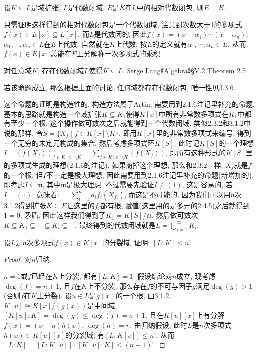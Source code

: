 \documentclass{../solutions-cn}
\begin{document}
\begin{remark}
    \begin{propstar}
        设$K \subseteq L$是域扩张, $L$是代数闭域, $E$是$K$在$L$中的相对代数闭包, 则$E = \overline{K}$.
    \end{propstar}
    只需证明这样得到的相对代数闭包是一个代数闭域, 注意到次数大于1的多项式$f(x) \in E[x] \subseteq L[x]$, 而$L$是代数闭的, 因此$f(x) = (x - \alpha_1) \cdots (x - \alpha_n)$, $\alpha_1, \cdots, \alpha_n \in L$在$E$上代数, 自然就在$K$上代数, 按$E$的定义就有$\alpha_1, \cdots, \alpha_n \in E$. 从而$f(x) \in E[x]$总能在$E$上分解称一次多项式的乘积.

    \begin{propstar}
        对任意域$K$, 存在代数闭域$L$使得$K \subseteq L$. Serge Lang《Algebra》\S V.2 Theorem 2.5
    \end{propstar}
    若该命题成立, 那么根据上面的讨论, 任何域都存在代数闭包, 唯一性见3.3.6.

    这个命题的证明是构造性的, 构造方法属于Artin, 需要用到2.1.6注记里补充的命题. 基本的思路就是构造一个域扩张$K \subseteq K_1$使得$K[x]$中所有非常数多项式在$K_1$中都有至少一个根, 这个操作做可数次之后就能得到一个代数闭域. 类似2.3.2和3.1.2中说的那样, 令$S = \{X_f \mid f \in K[x] \setminus K\}$, 即用$K[x]$里的非常数多项式来编号, 得到一个无穷的未定元构成的集合, 然后考虑多项式环$K[S]$. 此时记$K[S]$的一个理想$I = (f(X_f))_{f \in K[x] \setminus K} = \sum_{f \in K[x] \setminus K} (f(X_f))$, 即所有这种形式的$K[S]$里的多项式生成的理想(2.1.6的注记), 如果商掉这个理想, 那么和2.3.2一样, $\overline{X_f}$就是$f$的一个根, 但$I$不一定是极大理想, 因此需要用到2.1.6注记里补充的命题(新增加的), 即考虑$I \subseteq \mathfrak{m}$, 其中$\mathfrak{m}$是极大理想. 不过需要先验证$I \neq (1)$, 这是容易的, 若$I = (1)$, 意味着$1 = \sum_{i = 1}^{n} a_if_i(X_{f_i})$, 而这是不可能的, 因为我们可以用$n$次3.1.2得到扩张$K \subseteq E$让这里的$f_i$都有根, 赋值(这里用的是多元的2.4.5)之后就得到$1 = 0$, 矛盾. 因此这样我们得到了$K_1 = K[S]/\mathfrak{m}$. 然后做可数次$K \subseteq K_1 \subseteq \cdots \subseteq K_i \subseteq \cdots$. 最终得到的代数闭域就是$L = \bigcup_{i = 1}^{\infty} K_i$.
\end{remark}

\begin{exercise}[习题3.3.3]
    设$L$是$n$次多项式$f(x) \in K[x]$的分裂域, 证明: $[L:K] \leqslant n!$.
\end{exercise}

\begin{proof}
    对$n$归纳.

    $n = 1$或$f$已经在$K$上分裂, 都有$[L:K] = 1$. 假设结论对$n$成立, 现考虑$\deg(f) = n + 1$, 且$f$在$K$上不分裂, 那么存在$f$的不可与因子$g$满足$\deg(g) > 1$(否则$f$在$K$上分裂). 设$u \in L$是$g(x)$的一个根, 由3.1.2, $K[u] \cong K[x]/(g(x))$是中间域, $[K[u]:K] = \deg(g) \leqslant \deg(f) = n + 1$, 且在$K[u][x]$上有分解$f(x) = (x - u)h(x)$, $\deg(h) = n$. 由归纳假设, 此时$L$是$n$次多项式$h(x) \in K[u][x]$的分裂域, 有$[L:K[u]] \leqslant n!$, 从而$[L:K] = [L:K[u]] \cdot [K[u]:K] \leqslant (n + 1)!$.
\end{proof}
\end{document}
